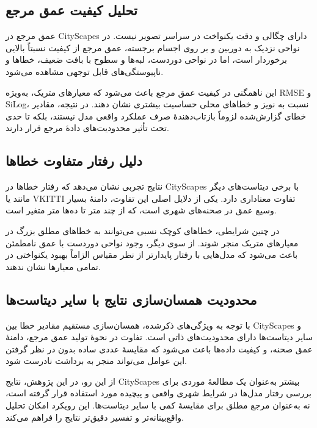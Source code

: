 \subsection{تحلیل کیفیت عمق مرجع}
\label{subsec:cityscapes_gt}

عمق مرجع در CityScapes
دارای چگالی و دقت یکنواخت در سراسر تصویر نیست.
در نواحی نزدیک به دوربین
و بر روی اجسام برجسته،
عمق مرجع از کیفیت نسبتاً بالایی برخوردار است،
اما در نواحی دوردست،
لبه‌ها و سطوح با بافت ضعیف،
خطاها و ناپیوستگی‌های قابل توجهی مشاهده می‌شود.

این ناهمگنی در کیفیت عمق مرجع
باعث می‌شود که
معیارهای متریک،
به‌ویژه RMSE و SiLog،
نسبت به نویز و خطاهای محلی
حساسیت بیشتری نشان دهند.
در نتیجه،
مقادیر خطای گزارش‌شده
لزوماً بازتاب‌دهندهٔ صرف
عملکرد واقعی مدل نیستند،
بلکه تا حدی تحت تأثیر محدودیت‌های دادهٔ مرجع قرار دارند.

\subsection{دلیل رفتار متفاوت خطاها}
\label{subsec:cityscapes_error_behavior}

نتایج تجربی نشان می‌دهد که
رفتار خطاها در CityScapes
با برخی دیتاست‌های دیگر
مانند  یا VKITTI
تفاوت معناداری دارد.
یکی از دلایل اصلی این تفاوت،
دامنهٔ بسیار وسیع عمق در صحنه‌های شهری است،
که از چند متر تا ده‌ها متر متغیر است.

در چنین شرایطی،
خطاهای کوچک نسبی
می‌توانند به خطاهای مطلق بزرگ
در معیارهای متریک منجر شوند.
از سوی دیگر،
وجود نواحی دوردست با عمق نامطمئن
باعث می‌شود که
مدل‌هایی با رفتار پایدارتر از نظر مقیاس
الزاماً بهبود یکنواختی
در تمامی معیارها نشان ندهند.

\subsection{محدودیت همسان‌سازی نتایج با سایر دیتاست‌ها}
\label{subsec:cityscapes_limitations}

با توجه به ویژگی‌های ذکرشده،
همسان‌سازی مستقیم مقادیر خطا
بین CityScapes و سایر دیتاست‌ها
دارای محدودیت‌های ذاتی است.
تفاوت در نحوهٔ تولید عمق مرجع،
دامنهٔ عمق صحنه،
و کیفیت داده‌ها
باعث می‌شود که
مقایسهٔ عددی ساده
بدون در نظر گرفتن این عوامل
می‌تواند منجر به برداشت نادرست شود.

از این رو،
در این پژوهش،
نتایج CityScapes
بیشتر به‌عنوان یک مطالعهٔ موردی
برای بررسی رفتار مدل‌ها
در شرایط شهری واقعی و پیچیده
مورد استفاده قرار گرفته است،
نه به‌عنوان مرجع مطلق
برای مقایسهٔ کمی با سایر دیتاست‌ها.
این رویکرد امکان تحلیل واقع‌بینانه‌تر
و تفسیر دقیق‌تر نتایج
را فراهم می‌کند.


